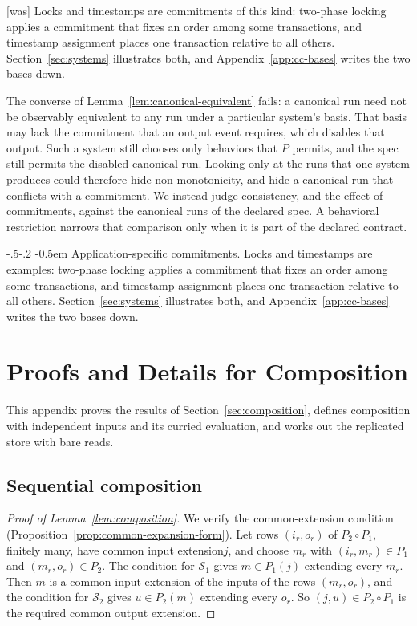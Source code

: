 \documentclass[sigconf]{cidr-2027}
\makeatletter
\theoremstyle{remark}
\renewcommand\paragraph{\@startsection{paragraph}{4}{\z@}%
  {-.5\baselineskip \@plus -2\p@ \@minus -.2\p@}%
  {-0.5em}%
  {\normalfont\bfseries}}
\newcommand{\commitment}{commitment\xspace}
\newcommand{\commitments}{commitments\xspace}
\newcommand{\indesc}{input extension\xspace} %
\newcommand{\outrelpart}{extending\xspace}    %
\newcommand{\outnoun}{output extension\xspace}%
\newcommand{\Spec}{\mathcal{S}}
\makeatother
\begin{document}
{\footnotesize\color{black!50}\noindent\textsf{[was]} Locks and timestamps are \commitments of this kind: two-phase locking applies a \commitment that fixes an order among some transactions, and timestamp assignment places one transaction
relative to all others.  Section~\ref{sec:systems} illustrates both, and
Appendix~\ref{app:cc-bases} writes the two bases down.\par}

\color{blue!70!black}The converse of Lemma~\ref{lem:canonical-equivalent} fails: a canonical run
need not be observably equivalent to any run under a particular system's
basis.  That basis may lack the \commitment that an output event requires,
which disables that output.  Such a system still chooses only behaviors that
$P$ permits, and the spec still permits the disabled canonical run.  Looking
only at the runs that one system produces could therefore hide
non-monotonicity, and hide a canonical run that conflicts with a \commitment.
We instead judge consistency, and the effect of \commitments, against the
canonical runs of the declared spec.  A behavioral restriction narrows that
comparison only when it is part of the declared contract.\color{black}

\paragraph{Application-specific \commitments.}
\color{blue!70!black}Locks and timestamps are examples: two-phase locking applies a \commitment
that fixes an order among some transactions, and timestamp assignment places
one transaction relative to all others.  Section~\ref{sec:systems} illustrates both, and
Appendix~\ref{app:cc-bases} writes the two bases down.\color{black}

\section{Proofs and Details for Composition}
\label{app:composition}

This appendix proves the results of Section~\ref{sec:composition}, defines
composition with independent inputs and its curried evaluation, and works out
the replicated store with bare reads.

\subsection{Sequential composition}

\begin{proof}[Proof of Lemma~\ref{lem:composition}]
We verify the common-extension condition
(Proposition~\ref{prop:common-expansion-form}).  Let rows $(i_r,o_r)$ of
$P_2\circ P_1$, finitely many, have common \indesc $j$, and choose $m_r$ with
$(i_r,m_r)\in P_1$ and $(m_r,o_r)\in P_2$.  The condition for $\Spec_1$ gives
$m\in P_1(j)$ \outrelpart every $m_r$.  Then $m$ is a common \indesc of the
inputs of the rows $(m_r,o_r)$, and the condition for $\Spec_2$ gives
$u\in P_2(m)$ \outrelpart every $o_r$.  So $(j,u)\in P_2\circ P_1$ is the
required common \outnoun.
\end{proof}
\end{document}
